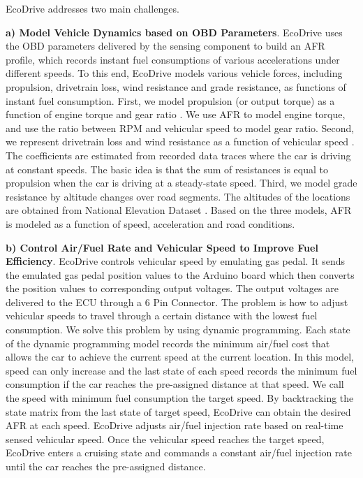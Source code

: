 EcoDrive addresses two main challenges. 


\textbf{a) Model Vehicle Dynamics based on OBD Parameters}.
EcoDrive uses the OBD parameters delivered by
the sensing component to build an AFR profile, 
which records instant fuel consumptions of various accelerations under different speeds. 
To this end, EcoDrive models various vehicle forces, 
including propulsion, drivetrain loss, wind resistance
and grade resistance, as functions of instant fuel consumption.  
First, we model propulsion (or output torque) as a function of engine
torque and gear ratio \cite{vong2006prediction, giannelli2005heavy}. 
We use AFR to model engine torque, and use the ratio between RPM
and vehicular speed to model gear ratio. 
Second, we represent drivetrain loss and wind resistance as a function
of vehicular speed \cite{andersson2012online}.
The coefficients are estimated from recorded data traces where
the car is driving at constant speeds. 
The basic idea is that the sum of resistances is equal to
propulsion when the car is driving at a steady-state speed. 
Third, we model grade resistance by altitude changes over road segments. 
The altitudes of the locations are obtained from 
National Elevation Dataset \cite{nationalelevation}.   
Based on the three models, AFR is modeled as a function of 
speed, acceleration and road conditions. 


\textbf{b) Control Air/Fuel Rate and Vehicular Speed to Improve Fuel Efficiency}.
EcoDrive controls vehicular speed by emulating gas pedal. 
It sends the emulated gas pedal position values to the
Arduino board which then converts the position
values to corresponding output voltages.
The output voltages are delivered to the ECU through a 6 Pin Connector.  
The problem is how to adjust vehicular speeds to travel through
a certain distance with the lowest fuel consumption.
We solve this problem by using dynamic programming. 
Each state of the dynamic programming model records 
the minimum air/fuel cost that allows the car to achieve
the current speed at the current location. 
In this model, speed can only increase and the last state of each
speed records the minimum fuel consumption if the car reaches the pre-assigned distance at that speed. 
We call the speed with minimum fuel consumption the target speed.  
By backtracking the state matrix from the last state
of target speed, EcoDrive can obtain the desired AFR at each speed. 
EcoDrive adjusts air/fuel injection rate based on real-time sensed vehicular speed. 
Once the vehicular speed reaches the target speed, EcoDrive
enters a cruising state and commands a constant air/fuel injection rate
until the car reaches the pre-assigned distance. 



